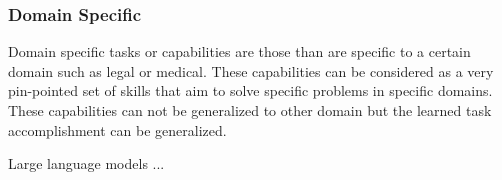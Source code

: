 \subsubsection{Domain Specific}
Domain specific tasks or capabilities are those than are specific to a certain domain such as legal or medical. These capabilities can be considered as a very pin-pointed set of skills that aim to solve specific problems in specific domains. These capabilities can not be generalized to other domain but the learned task accomplishment can be generalized.

Large language models ...






